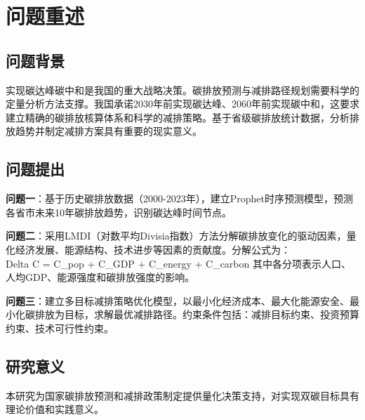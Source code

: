 \newpage
\section{问题重述}

\subsection{问题背景}
实现碳达峰碳中和是我国的重大战略决策。碳排放预测与减排路径规划需要科学的定量分析方法支撑。我国承诺2030年前实现碳达峰、2060年前实现碳中和，这要求建立精确的碳排放核算体系和科学的减排策略。基于省级碳排放统计数据，分析排放趋势并制定减排方案具有重要的现实意义。

\subsection{问题提出}
\textbf{问题一}：基于历史碳排放数据（2000-2023年），建立Prophet时序预测模型，预测各省市未来10年碳排放趋势，识别碳达峰时间节点。

\textbf{问题二}：采用LMDI（对数平均Divisia指数）方法分解碳排放变化的驱动因素，量化经济发展、能源结构、技术进步等因素的贡献度。分解公式为：\\Delta C = \Delta C_{pop} + \Delta C_{GDP} + \Delta C_{energy} + \Delta C_{carbon}
其中各分项表示人口、人均GDP、能源强度和碳排放强度的影响。

\textbf{问题三}：建立多目标减排策略优化模型，以最小化经济成本、最大化能源安全、最小化碳排放为目标，求解最优减排路径。约束条件包括：减排目标约束、投资预算约束、技术可行性约束。

\subsection{研究意义}
本研究为国家碳排放预测和减排政策制定提供量化决策支持，对实现双碳目标具有理论价值和实践意义。
